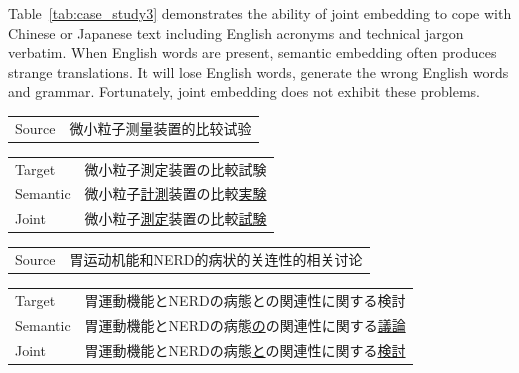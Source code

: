 \begin{CJK}{UTF8}{ipxm}
    Table~\ref{tab:case_study3} demonstrates the ability of joint embedding to cope with Chinese or Japanese text including English acronyms and technical jargon verbatim.  When English words are present, semantic embedding often produces strange translations.
It will lose English words, generate the wrong English words and grammar.  Fortunately, joint embedding does not exhibit these problems.
\end{CJK}

\begin{table}[h]
    \centering

    \begin{CJK}{UTF8}{gbsn}
        \begin{tabularx}{\textwidth}{p{1.2cm}b}\toprule
            Source & 微小粒子测量装置的比较试验 \\
        \end{tabularx}
    \end{CJK}

    \begin{CJK}{UTF8}{ipxm}
        \begin{tabularx}{\textwidth}{p{1.2cm}b}
            Target & 微小粒子測定装置の比較試験 \\
            Semantic & 微小粒子\underline{計測}装置の比較\underline{実験} \\
            Joint & 微小粒子\underline{測定}装置の比較\underline{試験} \\\midrule
        \end{tabularx}
    \end{CJK}

    \begin{CJK}{UTF8}{gbsn}
        \begin{tabularx}{\textwidth}{p{1.2cm}b}
            Source & 胃运动机能和NERD的病状的关连性的相关讨论 \\
        \end{tabularx}
    \end{CJK}

    \begin{CJK}{UTF8}{ipxm}
        \begin{tabularx}{\textwidth}{p{1.2cm}b}
            Target & 胃運動機能とNERDの病態との関連性に関する検討 \\
            Semantic & 胃運動機能とNERDの病態\underline{の}の関連性に関する\underline{議論} \\
            Joint & 胃運動機能とNERDの病態\underline{と}の関連性に関する\underline{検討} \\\midrule
        \end{tabularx}
    \end{CJK}


\end{table}

